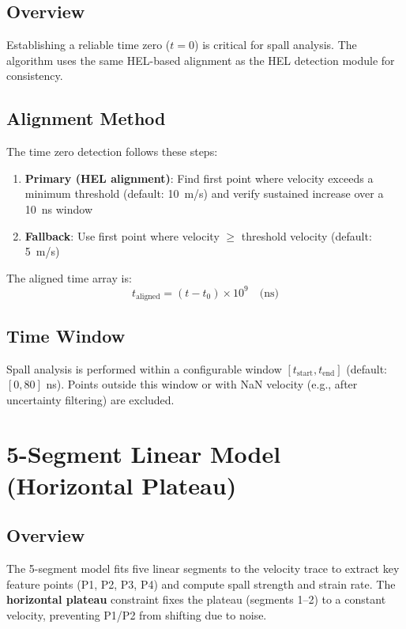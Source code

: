 \subsection{Overview}
Establishing a reliable time zero ($t=0$) is critical for spall analysis. The algorithm uses the same HEL-based alignment as the HEL detection module for consistency.

\subsection{Alignment Method}
The time zero detection follows these steps:
\begin{enumerate}
    \item \textbf{Primary (HEL alignment)}: Find first point where velocity exceeds a minimum threshold (default: \SI{10}{m/s}) and verify sustained increase over a \SI{10}{ns} window
    \item \textbf{Fallback}: Use first point where velocity $\geq$ threshold velocity (default: \SI{5}{m/s})
\end{enumerate}

The aligned time array is:
\begin{equation}
t_{\text{aligned}} = (t - t_0) \times 10^9 \quad \text{(ns)}
\end{equation}

\subsection{Time Window}
Spall analysis is performed within a configurable window $[t_{\text{start}}, t_{\text{end}}]$ (default: $[0, 80]$ ns). Points outside this window or with NaN velocity (e.g., after uncertainty filtering) are excluded.

\section{5-Segment Linear Model (Horizontal Plateau)}

\subsection{Overview}
The 5-segment model fits five linear segments to the velocity trace to extract key feature points (P1, P2, P3, P4) and compute spall strength and strain rate. The \textbf{horizontal plateau} constraint fixes the plateau (segments 1--2) to a constant velocity, preventing P1/P2 from shifting due to noise.

